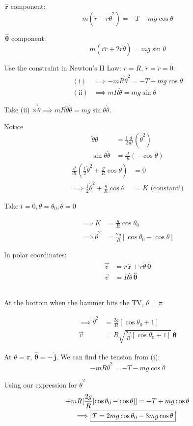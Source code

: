 \documentclass[twoside]{scrartcl}
\let\oldhat\hat
\renewcommand{\hat}[1]{\,\oldhat{\boldsymbol{\mathbf{#1}}}}
\begin{document}
\begin{example}[\href{https://www.youtube.com/watch?v=qybUFnY7Y8w}{OK Go Video}]
$\hat{r}$ component: 
\[
  m(\ddot{r} - r\dot{\theta}^2) = -T-mg\cos\theta \tag{i}
\]

$\hat{\theta}$ component:
\[
  m(r\ddot{r} + 2\dot{r}\dot{\theta}) = mg\sin\theta \tag{ii}
\]

Use the constraint in Newton's II Law: $r = R$, $\dot{r} = \ddot{r} = 0$. 
\[
\begin{aligned}
  \mathrm{(i)} &\implies -mR\dot{\theta}^2 = -T-mg\cos\theta \\
  \mathrm{(ii)} &\implies mR\ddot{\theta} = mg\sin\theta
\end{aligned}
\]

Take (ii) $\times \dot{\theta} \implies mR\ddot{\theta}\dot{\theta} = mg\sin\theta\dot{\theta}$. 

Notice 
\[
\begin{aligned}
  \ddot{\theta}\dot{\theta} &= \frac{1}{2}\frac{d}{dt}(\dot{\theta}^2)\\
  \sin\theta\dot{\theta} &= \frac{d}{dt}(-\cos\theta)
\end{aligned}
\]
\[
\begin{aligned}
    \frac{d}{dt}(\frac{1}{2}\dot{\theta}^2 + \frac{g}{R}\cos\theta) &= 0\\
  \implies \frac{1}{2}\dot{\theta}^2 + \frac{g}{R}\cos\theta &= K \text{ (constant!)}
\end{aligned}
\]

Take $t = 0, \theta = \theta_0, \dot{\theta} = 0$

\[
\begin{aligned}
\implies K &= \frac{g}{R}\cos\theta_0\\
\implies \dot{\theta}^2 &= \frac{2g}{R}[\cos\theta_0 - \cos\theta]  
\end{aligned}
\]

In polar coordinates: 
\[
\begin{aligned}
  \vec{v} &= \dot{r}\hat{r} + r\dot{\theta}\hat{\theta}\\
  \vec{v} &= R\dot{\theta}\hat{\theta}
\end{aligned}
\]~

At the bottom when the hammer hits the TV, $\theta = \pi$

\[
\begin{aligned}
  \implies \dot{\theta}^2 &= \frac{2g}{R}[\cos\theta_0 + 1]\\
  \vec{v} &= R\sqrt{\frac{2g}{R}[\cos\theta_0 + 1]}\hat{\theta}
\end{aligned}
\]

At $\theta = \pi, \hat{\theta} = -\hat{j}$. We can find the tension from (i): 
\[-mR\dot{\theta}^2 = -T - mg\cos\theta\]

Using our expression for $\dot{\theta}^2$
\[
\begin{aligned}
  +mR[\frac{2g}{R}[\cos\theta_0 -\cos\theta]] &= +T + mg\cos\theta\\
  \implies \Aboxed{T = 2mg\cos\theta_0 &-3mg\cos\theta} 
\end{aligned}
\]
\end{example}
\pagebreak
\end{document}
